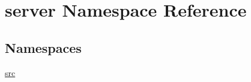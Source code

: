 \hypertarget{namespaceserver}{}\section{server Namespace Reference}
\label{namespaceserver}
\subsection*{Namespaces}
\begin{DoxyCompactItemize}
\item 
 \hyperlink{namespaceserver_1_1src}{src}
\end{DoxyCompactItemize}
